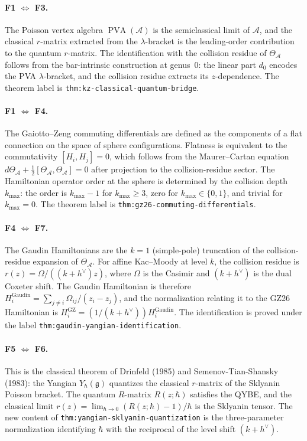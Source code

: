 \documentclass[11pt]{article}
\theoremstyle{plain}
\theoremstyle{definition}
\theoremstyle{remark}
\newcommand{\fg}{\mathfrak{g}}
\newcommand{\cA}{\mathcal{A}}
\begin{document}
\paragraph{F1 $\Leftrightarrow$ F3.}
The Poisson vertex algebra $\operatorname{PVA}(\cA)$ is the
semiclassical limit of $\cA$, and the classical $r$-matrix
extracted from the $\lambda$-bracket is the leading-order
contribution to the quantum $r$-matrix. The identification with
the collision residue of $\Theta_{\cA}$ follows from the
bar-intrinsic construction at genus~$0$: the linear part $d_0$
encodes the PVA $\lambda$-bracket, and the collision residue
extracts its $z$-dependence. The theorem label is
\texttt{thm:kz-classical-quantum-bridge}.

\paragraph{F1 $\Leftrightarrow$ F4.}
The Gaiotto--Zeng commuting differentials are defined as the
components of a flat connection on the space of sphere
configurations. Flatness is equivalent to the commutativity
$[H_i, H_j]=0$, which follows from the Maurer--Cartan equation
$d\Theta_{\cA}+\frac{1}{2}[\Theta_{\cA},\Theta_{\cA}]=0$ after
projection to the collision-residue sector. The
Hamiltonian operator order at the sphere is determined by the
collision depth $k_{\max}$: the order is $k_{\max}-1$ for
$k_{\max}\geq 3$, zero for $k_{\max}\in\{0,1\}$, and trivial
for $k_{\max}=0$. The theorem label is
\texttt{thm:gz26-commuting-differentials}.

\paragraph{F4 $\Leftrightarrow$ F7.}
The Gaudin Hamiltonians are the $k=1$ (simple-pole) truncation of
the collision-residue expansion of $\Theta_{\cA}$. For affine
Kac--Moody at level $k$, the collision residue is
$r(z) = \Omega/((k+h^{\vee})z)$, where $\Omega$ is the Casimir
and $(k+h^{\vee})$ is the dual Coxeter shift. The Gaudin
Hamiltonian is therefore
$H_i^{\mathrm{Gaudin}} = \sum_{j\neq i}\Omega_{ij}/(z_i-z_j)$,
and the normalization relating it to the GZ26 Hamiltonian is
$H_i^{\mathrm{GZ}} = (1/(k+h^{\vee}))H_i^{\mathrm{Gaudin}}$.
The identification is proved under the label
\texttt{thm:gaudin-yangian-identification}.

\paragraph{F5 $\Leftrightarrow$ F6.}
This is the classical theorem of Drinfeld (1985) and
Semenov-Tian-Shansky (1983): the Yangian $Y_{\hbar}(\fg)$
quantizes the classical $r$-matrix of the Sklyanin Poisson
bracket. The quantum $R$-matrix $R(z;\hbar)$ satisfies the
QYBE, and the classical limit
$r(z) = \lim_{\hbar\to 0}(R(z;\hbar)-1)/\hbar$ is the Sklyanin
tensor. The new content of
\texttt{thm:yangian-sklyanin-quantization} is the
three-parameter normalization identifying $\hbar$ with the
reciprocal of the level shift $(k+h^{\vee})$.
\end{document}
